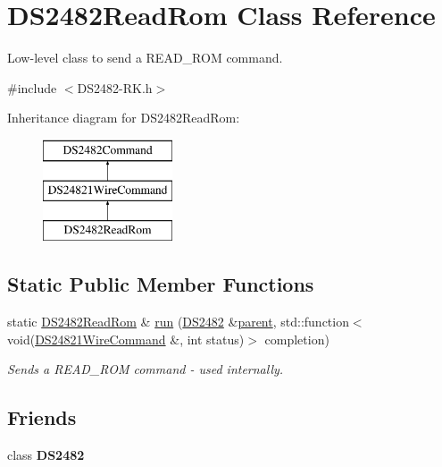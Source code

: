\hypertarget{class_d_s2482_read_rom}{}\section{D\+S2482\+Read\+Rom Class Reference}
\label{class_d_s2482_read_rom}


Low-\/level class to send a R\+E\+A\+D\+\_\+\+R\+OM command.  




{\ttfamily \#include $<$D\+S2482-\/\+R\+K.\+h$>$}

Inheritance diagram for D\+S2482\+Read\+Rom\+:\begin{figure}[H]
\begin{center}
\leavevmode
\includegraphics[height=3.000000cm]{class_d_s2482_read_rom}
\end{center}
\end{figure}
\subsection*{Static Public Member Functions}
\begin{DoxyCompactItemize}
\item 
\mbox{\label{class_d_s2482_read_rom_a6962376a38dee206044733f1fe6f6153}} 
static \mbox{\hyperlink{class_d_s2482_read_rom}{D\+S2482\+Read\+Rom}} \& \mbox{\hyperlink{class_d_s2482_read_rom_a6962376a38dee206044733f1fe6f6153}{run}} (\mbox{\hyperlink{class_d_s2482}{D\+S2482}} \&\mbox{\hyperlink{class_d_s2482_command_a54a41fb8a610ef2077f5e5377771aaf3}{parent}}, std\+::function$<$ void(\mbox{\hyperlink{class_d_s24821_wire_command}{D\+S24821\+Wire\+Command}} \&, int status)$>$ completion)
\begin{DoxyCompactList}\small\item\em Sends a R\+E\+A\+D\+\_\+\+R\+OM command -\/ used internally. \end{DoxyCompactList}\end{DoxyCompactItemize}
\subsection*{Friends}
\begin{DoxyCompactItemize}
\item 
\mbox{\label{class_d_s2482_read_rom_afeaf69274324e8dbeebede05c02d9c18}} 
class {\bfseries D\+S2482}
\end{DoxyCompactItemize}
